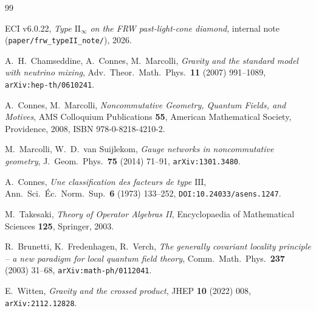 \documentclass[11pt,a4paper]{article}
\theoremstyle{definition}
\begin{document}

\begin{thebibliography}{99}

 ECI v6.0.22, \emph{Type $\mathrm{II}_\infty$ on the
FRW past-light-cone diamond}, internal note (\texttt{paper/frw\_typeII\_note/}),
2026.

 A.~H.~Chamseddine, A.~Connes, M.~Marcolli,
\emph{Gravity and the standard model with neutrino mixing}, Adv.\ Theor.\
Math.\ Phys.\ \textbf{11} (2007) 991--1089, \texttt{arXiv:hep-th/0610241}.

 A.~Connes, M.~Marcolli, \emph{Noncommutative
Geometry, Quantum Fields, and Motives}, AMS Colloquium Publications
\textbf{55}, American Mathematical Society, Providence, 2008,
ISBN 978-0-8218-4210-2.

 M.~Marcolli, W.~D.~van Suijlekom, \emph{Gauge networks
in noncommutative geometry}, J.\ Geom.\ Phys.\ \textbf{75} (2014)
71--91, \texttt{arXiv:1301.3480}.

 A.~Connes, \emph{Une classification des facteurs de
type $\mathrm{III}$}, Ann.\ Sci.\ Éc.\ Norm.\ Sup.\ \textbf{6} (1973)
133--252, \texttt{DOI:10.24033/asens.1247}.

 M.~Takesaki, \emph{Theory of Operator Algebras II},
Encyclopaedia of Mathematical Sciences \textbf{125}, Springer, 2003.

 R.~Brunetti, K.~Fredenhagen, R.~Verch, \emph{The generally
covariant locality principle -- a new paradigm for local quantum field
theory}, Comm.\ Math.\ Phys.\ \textbf{237} (2003) 31--68,
\texttt{arXiv:math-ph/0112041}.

 E.~Witten, \emph{Gravity and the crossed product},
JHEP \textbf{10} (2022) 008, \texttt{arXiv:2112.12828}.

\end{thebibliography}
\end{document}
